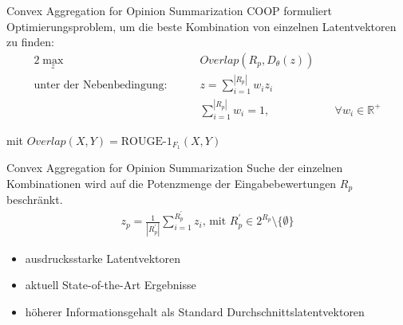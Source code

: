 \begin{frame}{Convex Aggregation for Opinion Summarization}
  COOP formuliert Optimierungsproblem, um die beste Kombination von einzelnen Latentvektoren zu finden:
\begin{alignat*}{2}
    \max_z              &\quad&  Overlap(R_p, D_\theta(z))    & \\
    \text{unter der Nebenbedingung: } &\quad&  z = \sum_{i=1}^{|R_p|} w_i z_i \\
                         &\quad&  \sum_{i=1}^{|R_p|}w_i=1,                        &\quad \forall w_i \in \mathbb{R}^+
\end{alignat*}

mit $Overlap(X,Y) = \text{ROUGE-1}_{F_1}(X,Y)$
\end{frame}


\begin{frame}{Convex Aggregation for Opinion Summarization}
  Suche der einzelnen Kombinationen wird auf die Potenzmenge der Eingabebewertungen $R_p$ beschränkt. 
\begin{align*}
z_p = \frac{1}{|R_p^{'}|} \sum_{i=1}^{R_p^{'}}z_i \text{, mit } R_p^{'} \in 2^{R_p} \setminus  \{ \emptyset\} 
\end{align*}

\begin{itemize}
\item ausdrucksstarke Latentvektoren
\item aktuell State-of-the-Art Ergebnisse
\item höherer Informationsgehalt als Standard Durchschnittslatentvektoren
\end{itemize}
\end{frame}



